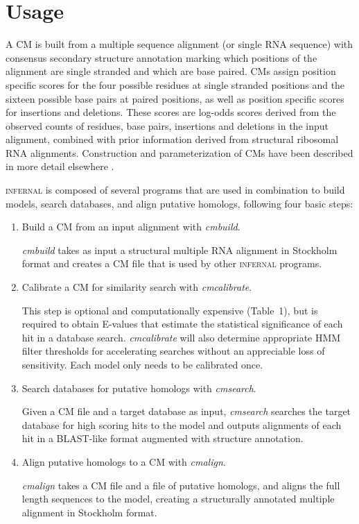 
\section{Usage} 

A CM is built from a multiple sequence alignment (or single RNA
sequence) with consensus secondary structure annotation marking which
positions of the alignment are single stranded and which are base
paired. CMs assign position specific scores for the four possible
residues at single stranded positions and the sixteen possible base
pairs at paired positions, as well as position specific scores for
insertions and deletions. These scores are log-odds scores derived
from the observed counts of residues, base pairs, insertions and
deletions in the input alignment, combined with prior information
derived from structural ribosomal RNA alignments. Construction and
parameterization of CMs have been described in more detail elsewhere
\citep{Eddy94,infguide03,Eddy02b,NawrockiEddy07}.

\textsc{infernal} is composed of several programs that are used in
combination to build models, search databases, and align putative
homologs, following four basic steps:

\begin{enumerate}
\item Build a CM from an input alignment with \emph{cmbuild}.

\emph{cmbuild} takes as input a structural multiple
RNA alignment in Stockholm format \citep{infguide03} and creates a CM
file that is used by other \textsc{infernal} programs.

\item Calibrate a CM for similarity search with \emph{cmcalibrate}.

This step is optional and computationally expensive (Table~1), but is
required to obtain E-values that estimate the statistical significance
of each hit in a database search. \emph{cmcalibrate} will
also determine appropriate HMM filter thresholds for accelerating
searches without an appreciable loss of sensitivity. Each model 
only needs to be calibrated once.

\item Search databases for putative homologs with \emph{cmsearch}.

Given a CM file and a target database as input, 
\emph{cmsearch} searches the target database
for high scoring hits to the model and outputs alignments
of each hit in a BLAST-like format augmented with structure
annotation.

\item Align putative homologs to a CM with \emph{cmalign}.

\emph{cmalign} takes a CM file and a file of putative homologs, and
aligns the full length sequences to the model, creating a structurally
annotated multiple alignment in Stockholm format.

\end{enumerate}

